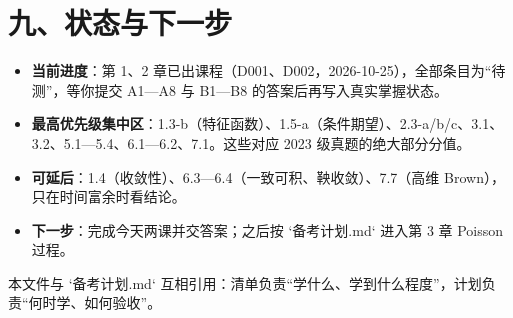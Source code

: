 \documentclass[UTF8,a4paper,11pt]{ctexart}
\begin{document}
\section{九、状态与下一步}
\begin{itemize}
\item \textbf{当前进度}：第 1、2 章已出课程（D001、D002，2026-10-25），全部条目为“待测”，等你提交 A1—A8 与 B1—B8 的答案后再写入真实掌握状态。
\item \textbf{最高优先级集中区}：1.3-b（特征函数）、1.5-a（条件期望）、2.3-a/b/c、3.1、3.2、5.1—5.4、6.1—6.2、7.1。这些对应 2023 级真题的绝大部分分值。
\item \textbf{可延后}：1.4（收敛性）、6.3—6.4（一致可积、鞅收敛）、7.7（高维 Brown），只在时间富余时看结论。
\item \textbf{下一步}：完成今天两课并交答案；之后按 `备考计划.md` 进入第 3 章 Poisson 过程。
\end{itemize}
本文件与 `备考计划.md` 互相引用：清单负责“学什么、学到什么程度”，计划负责“何时学、如何验收”。
\end{document}
